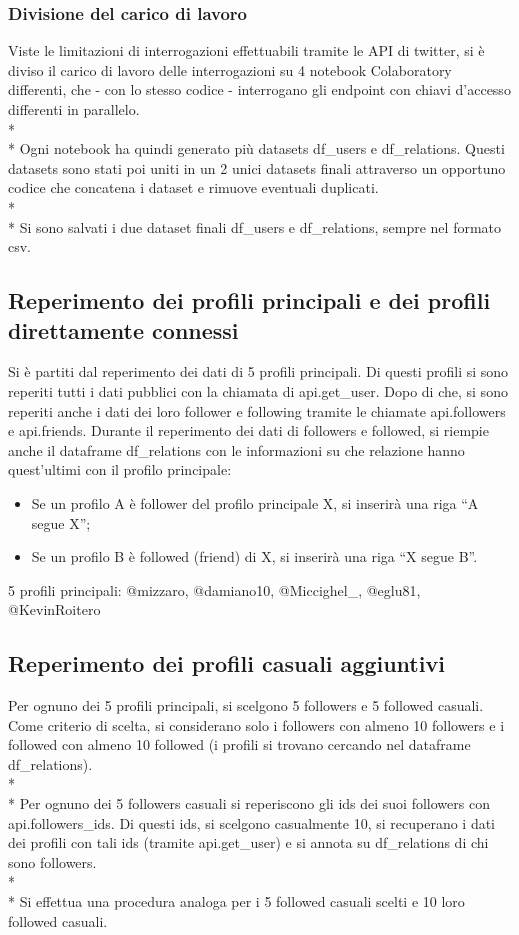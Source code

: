 \documentclass[a4paper, 12pt, twoside]{article}
\begin{document}
\subsubsection{Divisione del carico di lavoro}
Viste le limitazioni di interrogazioni effettuabili tramite le API di twitter, si è diviso il carico di lavoro delle interrogazioni su 4 notebook Colaboratory differenti, che - con lo stesso codice -  interrogano gli endpoint con chiavi d’accesso differenti in parallelo. \\* \\*
Ogni notebook ha quindi generato più datasets df\_users e df\_relations. Questi datasets sono stati poi uniti in un 2 unici datasets finali attraverso un opportuno codice che concatena i dataset e rimuove eventuali duplicati. \\* \\*
Si sono salvati i due dataset finali df\_users e df\_relations, sempre nel formato csv.


\subsection{Reperimento dei profili principali e dei profili direttamente connessi} 
Si è partiti dal reperimento dei dati di 5 profili principali. Di questi profili si sono reperiti tutti i dati pubblici con la chiamata di api.get\_user. Dopo di che, si sono reperiti anche i dati dei loro follower e following tramite le chiamate api.followers e api.friends. Durante il reperimento dei dati di followers e followed, si riempie anche il dataframe df\_relations con le informazioni su che relazione hanno quest’ultimi con il profilo principale:
\begin{itemize}
    \item Se un profilo A è follower del profilo principale X, si inserirà una riga “A segue X”;
    \item Se un profilo B è followed (friend) di X, si inserirà una riga “X segue B”.
\end{itemize}
5 profili principali:    @mizzaro, @damiano10, @Miccighel\_, @eglu81, @KevinRoitero


\subsection{Reperimento dei profili casuali aggiuntivi}
Per ognuno dei 5 profili principali, si scelgono 5 followers e 5 followed casuali. Come criterio di scelta, si considerano solo i followers con almeno 10 followers e i followed con almeno 10 followed (i profili si trovano cercando nel dataframe df\_relations). \\* \\*
Per ognuno dei 5 followers casuali si reperiscono gli ids dei suoi followers con  api.followers\_ids. Di questi ids, si scelgono casualmente 10, si recuperano i dati dei profili con tali ids (tramite  api.get\_user) e si annota su df\_relations di chi sono followers. \\* \\*
Si effettua una procedura analoga per i 5 followed casuali scelti e 10 loro followed casuali.
\end{document}
